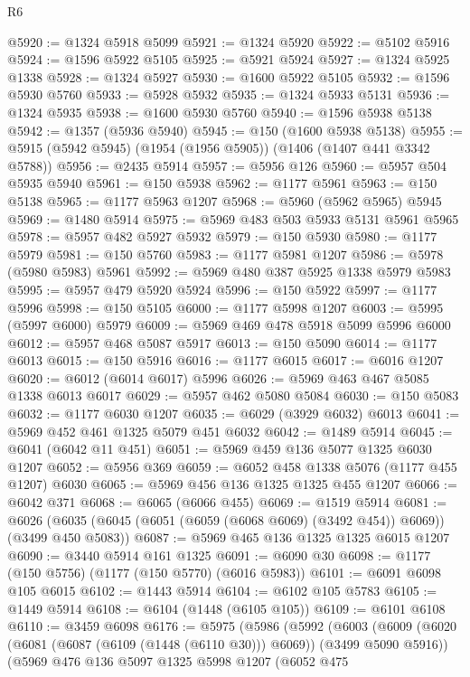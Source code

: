 \begin{lexlean}{R6}
\begin{coremodule}
@5920 := @1324 @5918 @5099
@5921 := @1324 @5920
@5922 := @5102 @5916
@5924 := @1596 @5922 @5105
@5925 := @5921 @5924
@5927 := @1324 @5925 @1338
@5928 := @1324 @5927
@5930 := @1600 @5922 @5105
@5932 := @1596 @5930 @5760
@5933 := @5928 @5932
@5935 := @1324 @5933 @5131
@5936 := @1324 @5935
@5938 := @1600 @5930 @5760
@5940 := @1596 @5938 @5138
@5942 := @1357 (@5936 @5940)
@5945 := @150 (@1600 @5938 @5138)
@5955 := @5915 (@5942 @5945) (@1954 (@1956 @5905)) (@1406 (@1407 @441 @3342 @5788))
@5956 := @2435 @5914
@5957 := @5956 @126
@5960 := @5957 @504 @5935 @5940
@5961 := @150 @5938
@5962 := @1177 @5961
@5963 := @150 @5138
@5965 := @1177 @5963 @1207
@5968 := @5960 (@5962 @5965) @5945
@5969 := @1480 @5914
@5975 := @5969 @483 @503 @5933 @5131 @5961 @5965
@5978 := @5957 @482 @5927 @5932
@5979 := @150 @5930
@5980 := @1177 @5979
@5981 := @150 @5760
@5983 := @1177 @5981 @1207
@5986 := @5978 (@5980 @5983) @5961
@5992 := @5969 @480 @387 @5925 @1338 @5979 @5983
@5995 := @5957 @479 @5920 @5924
@5996 := @150 @5922
@5997 := @1177 @5996
@5998 := @150 @5105
@6000 := @1177 @5998 @1207
@6003 := @5995 (@5997 @6000) @5979
@6009 := @5969 @469 @478 @5918 @5099 @5996 @6000
@6012 := @5957 @468 @5087 @5917
@6013 := @150 @5090
@6014 := @1177 @6013
@6015 := @150 @5916
@6016 := @1177 @6015
@6017 := @6016 @1207
@6020 := @6012 (@6014 @6017) @5996
@6026 := @5969 @463 @467 @5085 @1338 @6013 @6017
@6029 := @5957 @462 @5080 @5084
@6030 := @150 @5083
@6032 := @1177 @6030 @1207
@6035 := @6029 (@3929 @6032) @6013
@6041 := @5969 @452 @461 @1325 @5079 @451 @6032
@6042 := @1489 @5914
@6045 := @6041 (@6042 @11 @451)
@6051 := @5969 @459 @136 @5077 @1325 @6030 @1207
@6052 := @5956 @369
@6059 := @6052 @458 @1338 @5076 (@1177 @455 @1207) @6030
@6065 := @5969 @456 @136 @1325 @1325 @455 @1207
@6066 := @6042 @371
@6068 := @6065 (@6066 @455)
@6069 := @1519 @5914
@6081 := @6026 (@6035 (@6045 (@6051 (@6059 (@6068 @6069) (@3492 @454)) @6069)) (@3499 @450 @5083))
@6087 := @5969 @465 @136 @1325 @1325 @6015 @1207
@6090 := @3440 @5914 @161 @1325
@6091 := @6090 @30
@6098 := @1177 (@150 @5756) (@1177 (@150 @5770) (@6016 @5983))
@6101 := @6091 @6098 @105 @6015
@6102 := @1443 @5914
@6104 := @6102 @105 @5783
@6105 := @1449 @5914
@6108 := @6104 (@1448 (@6105 @105))
@6109 := @6101 @6108
@6110 := @3459 @6098
@6176 := @5975
    (@5986
      (@5992
        (@6003
          (@6009
            (@6020 (@6081 (@6087 (@6109 (@1448 (@6110 @30))) @6069)) (@3499 @5090 @5916))
            (@5969
              @476
              @136
              @5097
              @1325
              @5998
              @1207
              (@6052
                @475

\end{coremodule}
\end{lexlean}
